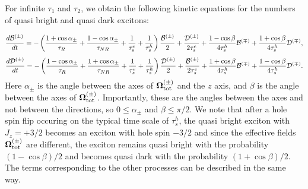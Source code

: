 \documentclass[twocolumn,showpacs,preprintnumbers,amsmath,amssymb,aps]{revtex4-1}
\begin{document}
For infinite $\tau_{1}$ and $\tau_{2}$, we obtain the
following kinetic equations for the numbers of quasi bright and quasi dark
excitons:
\begin{widetext}
\begin{equation} \label{kB_basic}
\frac{d {\cal B}^{(\pm)}}{dt} =
 - \left( \frac{1+\cos\alpha_\pm}{\tau_R} + \frac{1-\cos\alpha_\pm}{\tau_{NR}} + \frac{1}{\tau_s^e} + \frac{1}{\tau_s^h} \right) \frac{{\cal B}^{(\pm)}}{2}
  + \frac{{\cal D}^{(\pm)}}{2\tau_s^e} + \frac{1-\cos\beta}{4\tau_s^h} {\cal B}^{(\mp)}
  + \frac{1+\cos\beta}{4\tau_s^h} {\cal D}^{(\mp)},
\end{equation}
\begin{equation}\label{kD_basic}
\frac{d {\cal D}^{(\pm)}}{dt} = - \left( \frac{1-\cos\alpha_\pm}{\tau_R} + \frac{1+\cos\alpha_\pm}{\tau_{NR}} + \frac{1}{\tau_s^e} + \frac{1}{\tau_s^h} \right)\frac{{\cal D}^{(\pm)}}{2}
  + \frac{{\cal B}^{(\pm)}}{2\tau_s^e} + \frac{1+\cos\beta}{4\tau_s^h} {\cal B}^{(\mp)}
  + \frac{1-\cos\beta}{4\tau_s^h}{\cal D}^{(\mp)}.
\end{equation}
Here $\alpha_\pm$ is the angle between the axes of ${\bm
\Omega}_{\rm tot}^{(\pm)}$ and the $z$ axis, and $\beta$
is the angle between the axes of ${\bm \Omega}_{\rm tot}^{(\pm)}$.
Importantly, these are the angles between the axes and not between
the directions, so $0\le\alpha_\pm$ and $\beta\le\pi/2$. We
note that after a hole spin flip occuring on the typical time scale of $\tau_s^h$,
the quasi bright exciton with $J_z = +3/2$ becomes an exciton with
hole spin $-3/2$ and since the effective fields ${\bm
\Omega}_{\rm tot}^{(\pm)}$ are different, the exciton remains quasi
bright with the probability $(1-\cos\beta)/2$ and
becomes quasi dark with the probability
$(1+\cos\beta)/2$. The terms corresponding to the other
processes can be described in the same way.


\end{widetext}
\end{document}

